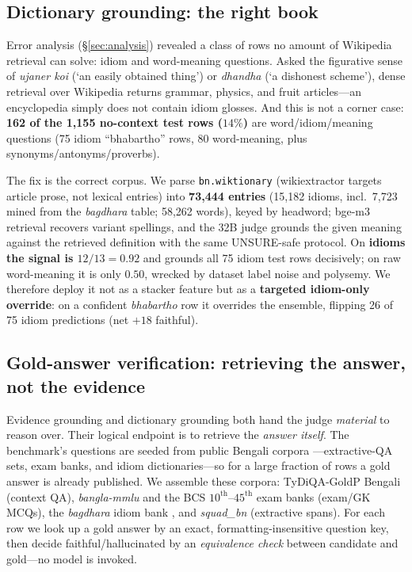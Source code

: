 \documentclass[11pt]{article}
\newcommand{\bn}[2]{\emph{#1} (`#2')}   %
\begin{document}
\subsection{Dictionary grounding: the right book}
\label{sec:wikt}
Error analysis (\S\ref{sec:analysis}) revealed a class of rows no amount of
Wikipedia retrieval can solve: idiom and word-meaning questions. Asked the
figurative sense of \bn{ujaner koi}{an easily obtained thing} or
\bn{dhandha}{a dishonest scheme}, dense retrieval over Wikipedia returns
grammar, physics, and fruit articles---an encyclopedia simply does not contain
idiom glosses. And this is not a corner case: \textbf{162 of the 1{,}155
no-context test rows ($14\%$)} are word/idiom/meaning questions (75 idiom
``bhabartho'' rows, 80 word-meaning, plus synonyms/antonyms/proverbs).

The fix is the correct corpus. We parse \texttt{bn.wiktionary} (wikiextractor
targets article prose, not lexical entries) into \textbf{73{,}444 entries}
(15{,}182 idioms, incl.\ 7{,}723 mined from the \emph{bagdhara} table; 58{,}262
words), keyed by headword; bge-m3 retrieval recovers variant spellings, and the
32B judge grounds the given meaning against the retrieved definition with the
same UNSURE-safe protocol. On \textbf{idioms the signal is $12/13=0.92$} and
grounds all 75 idiom test rows decisively; on raw word-meaning it is only $0.50$,
wrecked by dataset label noise and polysemy. We therefore deploy it not as a
stacker feature but as a \textbf{targeted idiom-only override}: on a confident
\emph{bhabartho} row it overrides the ensemble, flipping 26 of 75 idiom
predictions (net $+18$ faithful).

\subsection{Gold-answer verification: retrieving the answer, not the evidence}
\label{sec:gold}
Evidence grounding and dictionary grounding both hand the judge \emph{material}
to reason over. Their logical endpoint is to retrieve the \emph{answer itself}.
The benchmark's questions are seeded from public Bengali corpora
\citep{benhallueval}---extractive-QA sets, exam banks, and idiom
dictionaries---so for a large fraction of rows a gold answer is already
published. We assemble these corpora: TyDiQA-GoldP Bengali \citep{tydiqa}
(context QA), \emph{bangla-mmlu} \citep{banglammlu} and the BCS
$10^{\text{th}}$--$45^{\text{th}}$ exam banks \citep{bcsbanks} (exam/GK MCQs),
the \emph{bagdhara} idiom bank \citep{bagdhara}, and \emph{squad\_bn}
\citep{squadbn} (extractive spans). For each row we look up a gold answer by an
exact, formatting-insensitive question key, then decide faithful/hallucinated by
an \emph{equivalence check} between candidate and gold---no model is invoked.
\end{document}
